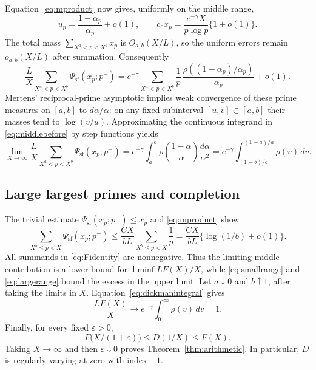 Equation~\eqref{eq:mproduct} now gives, uniformly on the middle range,
\[
 u_p=\frac{1-\alpha_p}{\alpha_p}+o(1),\qquad
 c_0x_p=\frac{e^{-\gamma}X}{p\log p}\{1+o(1)\}.
\]
The total mass $\sum_{X^a<p<X^b}x_p$ is $O_{a,b}(X/L)$, so the uniform
errors remain $o_{a,b}(X/L)$ after summation. Consequently
\begin{equation}\label{eq:middlebefore}
 \frac LX\sum_{X^a<p<X^b}\Psi_{\mathrm{sf}}(x_p;p^-)
 =e^{-\gamma}\sum_{X^a<p<X^b}
 \frac1p\,\frac{\rho((1-\alpha_p)/\alpha_p)}{\alpha_p}+o(1).
\end{equation}
Mertens' reciprocal-prime asymptotic implies weak convergence of these
prime measures on $[a,b]$ to $d\alpha/\alpha$: on any fixed subinterval
$[u,v]\subset[a,b]$ their masses tend to $\log(v/u)$.
Approximating the continuous integrand in \eqref{eq:middlebefore} by
step functions yields
\begin{equation}\label{eq:middlelimit}
 \lim_{X\to\infty}\frac LX
 \sum_{X^a<p<X^b}\Psi_{\mathrm{sf}}(x_p;p^-)
 =e^{-\gamma}\int_a^b
     \rho\!\left(\frac{1-\alpha}{\alpha}\right)\frac{d\alpha}{\alpha^2}
 =e^{-\gamma}\int_{(1-b)/b}^{(1-a)/a}\rho(v)\,dv.
\end{equation}

\subsection{Large largest primes and completion}
The trivial estimate $\Psi_{\mathrm{sf}}(x_p;p^-)\le x_p$ and
\eqref{eq:mproduct} show
\begin{equation}\label{eq:largerange}
 \sum_{X^b\le p<X}\Psi_{\mathrm{sf}}(x_p;p^-)
 \le \frac{CX}{bL}\sum_{X^b\le p<X}\frac1p
 =\frac{CX}{bL}\{\log(1/b)+o(1)\}.
\end{equation}
All summands in \eqref{eq:Fidentity} are nonnegative. Thus the limiting
middle contribution is a lower bound for $\liminf LF(X)/X$, while
\eqref{eq:smallrange} and \eqref{eq:largerange} bound the excess in the
upper limit. Let $a\downarrow0$ and $b\uparrow1$, after taking the limits
in $X$. Equation~\eqref{eq:dickmanintegral} gives
\[
 \frac{LF(X)}X\longrightarrow
 e^{-\gamma}\int_0^\infty\rho(v)\,dv=1.
\]
Finally, for every fixed $\varepsilon>0$,
\[
 F\bigl(X/(1+\varepsilon)\bigr)\le D(1/X)\le F(X).
\]
Taking $X\to\infty$ and then $\varepsilon\downarrow0$ proves
Theorem~\ref{thm:arithmetic}. In particular, $D$ is regularly varying
at zero with index $-1$.
